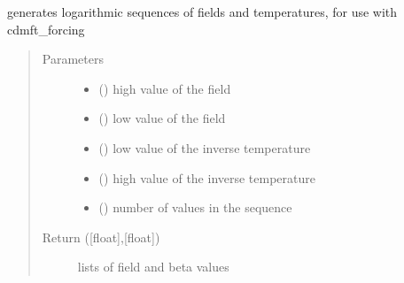 \documentclass[letterpaper,10pt,english]{sphinxmanual}
\begin{document}
\begin{fulllineitems}
\label{\detokenize{cdmft:pyqcm.cdmft.forcing_sequence}}
\sphinxAtStartPar
generates logarithmic sequences of fields and temperatures, for use with cdmft\_forcing
\begin{quote}\begin{description}
\item[{Parameters}] \leavevmode\begin{itemize}
\item {} 
\sphinxAtStartPar
{} () \textendash{} high value of the field

\item {} 
\sphinxAtStartPar
{} () \textendash{} low value of the field

\item {} 
\sphinxAtStartPar
{} () \textendash{} low value of the inverse temperature

\item {} 
\sphinxAtStartPar
{} () \textendash{} high value of the inverse temperature

\item {} 
\sphinxAtStartPar
{} () \textendash{} number of values in the sequence

\end{itemize}

\item[{Return ({[}float{]},{[}float{]})}] \leavevmode
\sphinxAtStartPar
lists of field and beta values

\end{description}\end{quote}

\end{fulllineitems}
\end{document}
